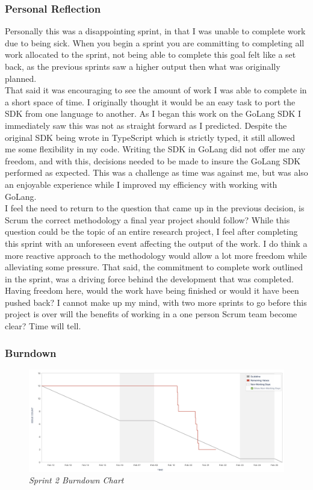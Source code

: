 \subsubsection{Personal Reflection}
Personally this was a disappointing sprint, in that I was unable to complete work due to being sick. When you begin a sprint you are committing to completing all work allocated to the sprint, not being able to complete this goal felt like a set back, as the previous sprints saw a higher output then what was originally planned.
\\That said it was encouraging to see the amount of work I was able to complete in a short space of time. I originally thought it would be an easy task to port the SDK from one language to another. As I began this work on the GoLang SDK I immediately saw this was not as straight forward as I predicted. Despite the original SDK being wrote in TypeScript which is strictly typed, it still allowed me some flexibility in my code. Writing the SDK in GoLang did not offer me any freedom, and with this, decisions needed to be made to insure the GoLang SDK performed as expected. This was a challenge as time was against me, but was also an enjoyable experience while I improved my efficiency with working with GoLang.
\\I feel the need to return to the question that came up in the previous decision, is Scrum the correct methodology a final year project should follow? While this question could be the topic of an entire research project, I feel after completing this sprint with an unforeseen event affecting the output of the work. I do think a more reactive approach to the methodology would allow a lot more freedom while alleviating some pressure. That said, the commitment to complete work outlined in the sprint, was a driving force behind the development that was completed. Having freedom here, would the work have being finished or would it have been pushed back? I cannot make up my mind, with two more sprints to go before this project is over will the benefits of working in a one person Scrum team become clear? Time will tell.
\subsubsection{Burndown}
\begin{figure}[!ht]
\centering
\includegraphics*[width=0.8
\textwidth]{images/sprint-3.png}
\caption{\em Sprint 2 Burndown Chart}
\label{img:bd3}
\end{figure}

